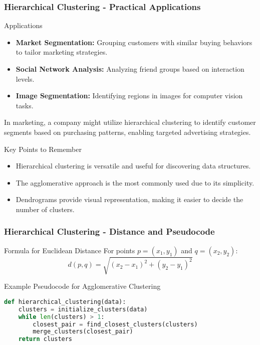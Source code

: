 \documentclass[aspectratio=169]{beamer}
\begin{document}
\begin{frame}[fragile]
    \frametitle{Hierarchical Clustering - Practical Applications}
    \begin{block}{Applications}
        \begin{itemize}
            \item \textbf{Market Segmentation:} Grouping customers with similar buying behaviors to tailor marketing strategies.
            \item \textbf{Social Network Analysis:} Analyzing friend groups based on interaction levels.
            \item \textbf{Image Segmentation:} Identifying regions in images for computer vision tasks.
        \end{itemize}
    \end{block}

    \begin{example}
        In marketing, a company might utilize hierarchical clustering to identify customer segments based on purchasing patterns, enabling targeted advertising strategies.
    \end{example}

    \begin{block}{Key Points to Remember}
        \begin{itemize}
            \item Hierarchical clustering is versatile and useful for discovering data structures.
            \item The agglomerative approach is the most commonly used due to its simplicity.
            \item Dendrograms provide visual representation, making it easier to decide the number of clusters.
        \end{itemize}
    \end{block}
\end{frame}

\begin{frame}[fragile]
    \frametitle{Hierarchical Clustering - Distance and Pseudocode}
    \begin{block}{Formula for Euclidean Distance}
        For points \( p = (x_1, y_1) \) and \( q = (x_2, y_2) \):
        \begin{equation}
            d(p, q) = \sqrt{(x_2 - x_1)^2 + (y_2 - y_1)^2}
        \end{equation}
    \end{block}
    
    \begin{block}{Example Pseudocode for Agglomerative Clustering}
        \begin{lstlisting}[language=Python]
def hierarchical_clustering(data):
    clusters = initialize_clusters(data)
    while len(clusters) > 1:
        closest_pair = find_closest_clusters(clusters)
        merge_clusters(closest_pair)
    return clusters
        \end{lstlisting}
    \end{block}
\end{frame}
\end{document}
